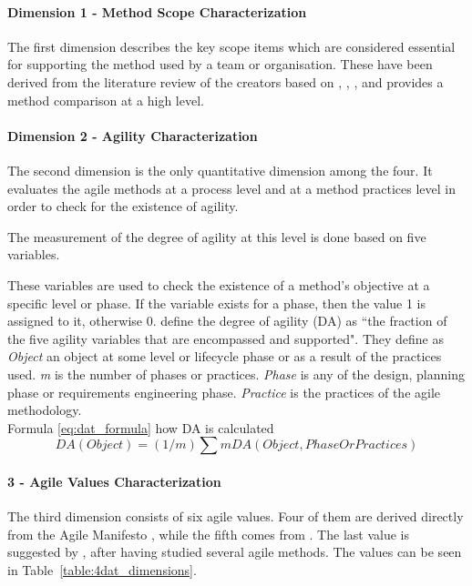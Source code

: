 \paragraph{Dimension 1 - Method Scope Characterization}
The first dimension describes the key scope items which are considered essential for supporting the method used by a team or organisation. These have been derived from the literature review of the creators based on \citet{Beck:2004:EPE:1076267}, \citet{koch2005agile}, \citet{Palmer:2001:PGF:600044}, \citet{Highsmith:2000:ASD:323922} and provides a method comparison at a high level.

\paragraph{Dimension 2 - Agility Characterization}
The second dimension is the only quantitative dimension among the four. It evaluates the agile methods at a process level and at a method practices level in order to check for the existence of agility.

The measurement of the degree of agility at this level is done based on five variables.

These variables are used to check the existence of a method's objective at a specific level or phase. If the variable exists for a phase, then the value 1 is assigned to it, otherwise 0. \citet{qumer2006measuring} define the degree of agility (DA) as ``the fraction of the five agility variables that are encompassed and supported". They define as \textit{Object} an object at some level or lifecycle phase or as a result of the practices used. \textit{m} is the number of phases or  practices. \textit{Phase} is any of the design, planning phase or requirements engineering phase. \textit{Practice} is the practices of the agile methodology. \\ %

Formula \eqref{eq:dat_formula} how DA is calculated\\
\begin{equation} \label{eq:dat_formula} DA (Object) = (1/m) \sum m DA(Object, Phase Or Practices) \end{equation}

\paragraph{3 - Agile Values Characterization}
The third dimension consists of six agile values. Four of them are derived directly from the Agile Manifesto \cite{beck2001agile}, while the fifth comes from \citet{koch2005agile}. The last value is suggested by \citet{qumer2006measuring}, after having studied several agile methods. The values can be seen in Table~\ref{table:4dat_dimensions}.

